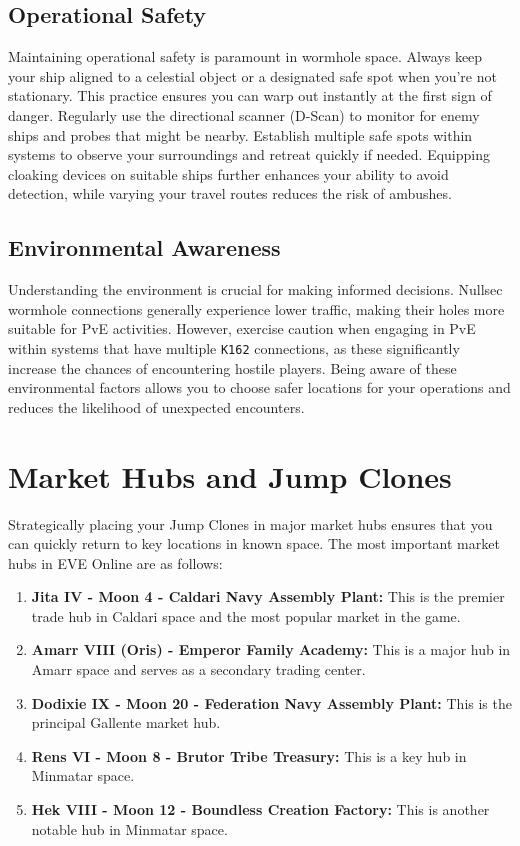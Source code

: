 \documentclass[a4paper,12pt]{article}
\begin{document}
\subsection{Operational Safety}

Maintaining operational safety is paramount in wormhole space. Always keep your ship aligned to a celestial object or a designated safe spot when you're not stationary. This practice ensures you can warp out instantly at the first sign of danger. Regularly use the directional scanner (D-Scan) to monitor for enemy ships and probes that might be nearby. Establish multiple safe spots within systems to observe your surroundings and retreat quickly if needed. Equipping cloaking devices on suitable ships further enhances your ability to avoid detection, while varying your travel routes reduces the risk of ambushes.

\subsection{Environmental Awareness}

Understanding the environment is crucial for making informed decisions. Nullsec wormhole connections generally experience lower traffic, making their holes more suitable for PvE activities. However, exercise caution when engaging in PvE within systems that have multiple \texttt{K162} connections, as these significantly increase the chances of encountering hostile players. Being aware of these environmental factors allows you to choose safer locations for your operations and reduces the likelihood of unexpected encounters.

\section{Market Hubs and Jump Clones}

Strategically placing your Jump Clones in major market hubs ensures that you can quickly return to key locations in known space. The most important market hubs in EVE Online are as follows:
\begin{enumerate}
    \item \textbf{Jita IV - Moon 4 - Caldari Navy Assembly Plant:} This is the premier trade hub in Caldari space and the most popular market in the game.
    \item \textbf{Amarr VIII (Oris) - Emperor Family Academy:} This is a major hub in Amarr space and serves as a secondary trading center.
    \item \textbf{Dodixie IX - Moon 20 - Federation Navy Assembly Plant:} This is the principal Gallente market hub.
    \item \textbf{Rens VI - Moon 8 - Brutor Tribe Treasury:} This is a key hub in Minmatar space.
    \item \textbf{Hek VIII - Moon 12 - Boundless Creation Factory:} This is another notable hub in Minmatar space.
\end{enumerate}
\end{document}
